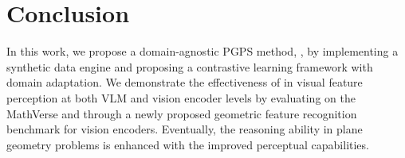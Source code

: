 \section{Conclusion}

In this work, we propose a domain-agnostic PGPS method, \geovlm{}, by implementing a synthetic data engine and proposing a contrastive learning framework with domain adaptation.
We demonstrate the effectiveness of \geovlm{} in visual feature perception at both VLM and vision encoder levels by evaluating on the MathVerse and through a newly proposed geometric feature recognition benchmark for vision encoders.
Eventually, the reasoning ability in plane geometry problems is enhanced with the improved perceptual capabilities.
